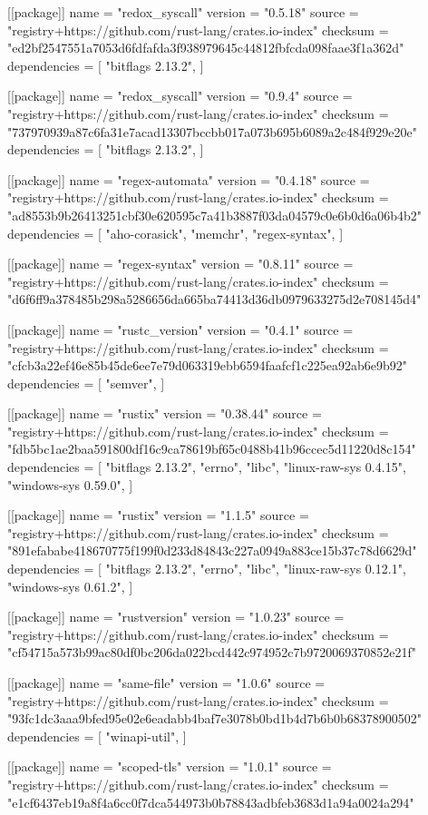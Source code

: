 [[package]]
name = "redox_syscall"
version = "0.5.18"
source = "registry+https://github.com/rust-lang/crates.io-index"
checksum = "ed2bf2547551a7053d6fdfafda3f938979645c44812fbfcda098faae3f1a362d"
dependencies = [
 "bitflags 2.13.2",
]

[[package]]
name = "redox_syscall"
version = "0.9.4"
source = "registry+https://github.com/rust-lang/crates.io-index"
checksum = "737970939a87c6fa31e7acad13307bccbb017a073b695b6089a2c484f929e20e"
dependencies = [
 "bitflags 2.13.2",
]

[[package]]
name = "regex-automata"
version = "0.4.18"
source = "registry+https://github.com/rust-lang/crates.io-index"
checksum = "ad8553b9b26413251cbf30e620595c7a41b3887f03da04579c0e6b0d6a06b4b2"
dependencies = [
 "aho-corasick",
 "memchr",
 "regex-syntax",
]

[[package]]
name = "regex-syntax"
version = "0.8.11"
source = "registry+https://github.com/rust-lang/crates.io-index"
checksum = "d6f6ff9a378485b298a5286656da665ba74413d36db0979633275d2e708145d4"

[[package]]
name = "rustc_version"
version = "0.4.1"
source = "registry+https://github.com/rust-lang/crates.io-index"
checksum = "cfcb3a22ef46e85b45de6ee7e79d063319ebb6594faafcf1c225ea92ab6e9b92"
dependencies = [
 "semver",
]

[[package]]
name = "rustix"
version = "0.38.44"
source = "registry+https://github.com/rust-lang/crates.io-index"
checksum = "fdb5bc1ae2baa591800df16c9ca78619bf65c0488b41b96ccec5d11220d8c154"
dependencies = [
 "bitflags 2.13.2",
 "errno",
 "libc",
 "linux-raw-sys 0.4.15",
 "windows-sys 0.59.0",
]

[[package]]
name = "rustix"
version = "1.1.5"
source = "registry+https://github.com/rust-lang/crates.io-index"
checksum = "891efababe418670775f199f0d233d84843c227a0949a883ce15b37c78d6629d"
dependencies = [
 "bitflags 2.13.2",
 "errno",
 "libc",
 "linux-raw-sys 0.12.1",
 "windows-sys 0.61.2",
]

[[package]]
name = "rustversion"
version = "1.0.23"
source = "registry+https://github.com/rust-lang/crates.io-index"
checksum = "cf54715a573b99ac80df0bc206da022bcd442c974952c7b9720069370852e21f"

[[package]]
name = "same-file"
version = "1.0.6"
source = "registry+https://github.com/rust-lang/crates.io-index"
checksum = "93fc1dc3aaa9bfed95e02e6eadabb4baf7e3078b0bd1b4d7b6b0b68378900502"
dependencies = [
 "winapi-util",
]

[[package]]
name = "scoped-tls"
version = "1.0.1"
source = "registry+https://github.com/rust-lang/crates.io-index"
checksum = "e1cf6437eb19a8f4a6cc0f7dca544973b0b78843adbfeb3683d1a94a0024a294"

